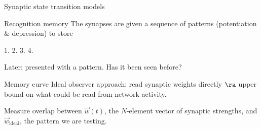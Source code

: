 \documentclass[final,hyperref={pdfpagelabels=false,bookmarks=false}]{beamer}
\newcommand{\pot}{^\text{pot}}
\newcommand{\dep}{^\text{dep}}
\newcommand{\W}{\vec{w}}
\begin{document}
\begin{frame}{}
\begin{columns}[t]
\begin{column}{0.33\linewidth}
\begin{block}{Synaptic state transition models}
%
\end{block}



\begin{block}{Recognition memory}
%
 The synapses are given a sequence of patterns (potentiation \& depression) to store
 
 \vp
 \begin{center}
 1. 
 \hspace{0.03\linewidth}
 2. 
 \hspace{0.03\linewidth}
 3. 
 \hspace{0.03\linewidth}
 4. 
 \end{center}
 
 \vp Later: presented with a pattern.
 Has it been seen before?
%
\end{block}


\begin{block}{Memory curve}
%
 Ideal observer approach: read synaptic weights directly
 $\ra$ upper bound on what could be read from network activity.

 \vp Measure overlap between $\W(t)$, the $N$-element vector of synaptic strengths, and $\W_\text{ideal}$, the pattern we are testing.
 

\end{block}
\end{column}
\end{columns}
\end{frame}
\end{document}
